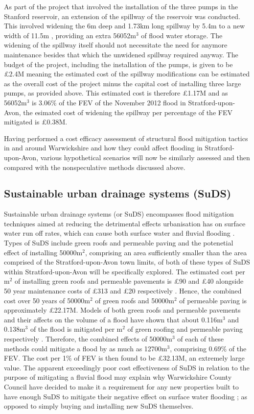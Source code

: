 \documentclass[11pt,a4paper]{article}
\begin{document}
As part of the project that involved the installation of the three pumps in the Stanford reservoir, an extension of the spillway of the reservoir was conducted. This involved widening the 6m deep and 1.73km long spillway by 5.4m to a new width of 11.5m \cite{spillway}, providing an extra 56052m$^3$ of flood water storage. The widening of the spillway itself should not necessitate the need for anymore maintenance besides that which the unwidened spillway required anyway. The budget of the project, including the installation of the pumps, is given to be \pounds2.4M \cite{spillway} meaning the estimated cost of the spillway modifications can be estimated as the overall cost of the project minus the capital cost of installing three large pumps, as provided above. This estimated cost is therefore \pounds1.17M and as 56052m$^3$ is 3.06\% of the FEV of the November 2012 flood in Stratford-upon-Avon, the esimated cost of widening the spillway per percentage of the FEV mitigated is \pounds0.38M.

Having performed a cost efficacy assessment of structural flood mitigation tactics in and around Warwickshire and how they could affect flooding in Stratford-upon-Avon, various hypothetical scenarios will now be similarly assessed and then compared with the nonspeculative methods discussed above.

\subsection{Sustainable urban drainage systems (SuDS)}
Sustainable urban drainage systems (or SuDS) encompasses flood mitigation techniques aimed at reducing the detrimental effects urbanisation has on surface water run off rates, which can cause both surface water and fluvial flooding \cite{suds}. Types of SuDS include green roofs and permeable paving and the potenetial effect of installing 50000m$^2$, comprising an area sufficiently smaller than the area comprised of the Stratford-upon-Avon town limits, of both of these types of SuDS within Stratford-upon-Avon will be specifically explored. The estimated cost per m$^2$ of installing green roofs and permeable pavements is \pounds90 and \pounds40 alongside 50 year maintenance costs of \pounds313 and \pounds20 respectively \cite{cost3}. Hence, the combined cost over 50 years of 50000m$^2$ of green roofs and 50000m$^2$ of permeable paving is approximately \pounds22.17M. Models of both green roofs and permeable pavements and their affects on the volume of a flood have shown that about 0.116m$^3$ and 0.138m$^3$ of the flood is mitigated per m$^2$ of green roofing and permeable paving respectively \cite{suds}. Therefore, the combined effects of 50000m$^3$ of each of these methods could mitigate a flood by as much as 12700m$^3$, comprising 0.69\% of the FEV. The cost per 1\% of FEV is then found to be \pounds32.13M, an extremely large value. The apparent exceedingly poor cost effectiveness of SuDS in relation to the purpose of mitigating a fluvial flood may explain why Warwickshire County Council have decided to make it a requirement for any new properties built to have enough SuDS to mitigate their negative effect on surface water flooding \cite{war2}{;} as opposed to simply buying and installing new SuDS themselves.
\end{document}
